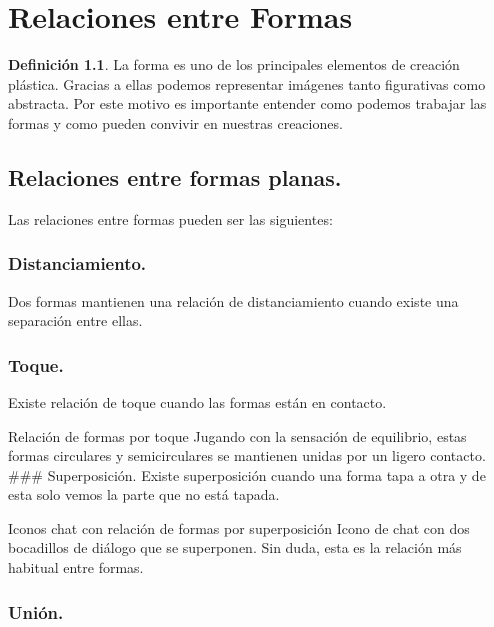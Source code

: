 \documentclass[16pt,]{krantz}
\theoremstyle{definition}
\newtheorem{definition}{Definición}[chapter]
\theoremstyle{definition}
\theoremstyle{definition}
\theoremstyle{definition}
\theoremstyle{remark}
\begin{document}
\hypertarget{relaciones-entre-formas}{%
\chapter{Relaciones entre Formas}\label{relaciones-entre-formas}}

\begin{definition}
La forma es uno de los principales elementos de creación plástica. Gracias a ellas podemos representar imágenes tanto figurativas como abstracta. Por este motivo es importante entender como podemos trabajar las formas y como pueden convivir en nuestras creaciones.
\end{definition}

\hypertarget{relaciones-entre-formas-planas.}{%
\section{Relaciones entre formas planas.}\label{relaciones-entre-formas-planas.}}

Las relaciones entre formas pueden ser las siguientes:

\hypertarget{distanciamiento.}{%
\subsection{Distanciamiento.}\label{distanciamiento.}}

Dos formas mantienen una relación de distanciamiento cuando existe una separación entre ellas.

\hypertarget{toque.}{%
\subsection{Toque.}\label{toque.}}

Existe relación de toque cuando las formas están en contacto.

Relación de formas por toque
Jugando con la sensación de equilibrio, estas formas circulares y semicirculares se mantienen unidas por un ligero contacto.
\#\#\# Superposición.
Existe superposición cuando una forma tapa a otra y de esta solo vemos la parte que no está tapada.

Iconos chat con relación de formas por superposición
Icono de chat con dos bocadillos de diálogo que se superponen. Sin duda, esta es la relación más habitual entre formas.

\hypertarget{uniuxf3n.}{%
\subsection{Unión.}\label{uniuxf3n.}}
\end{document}
